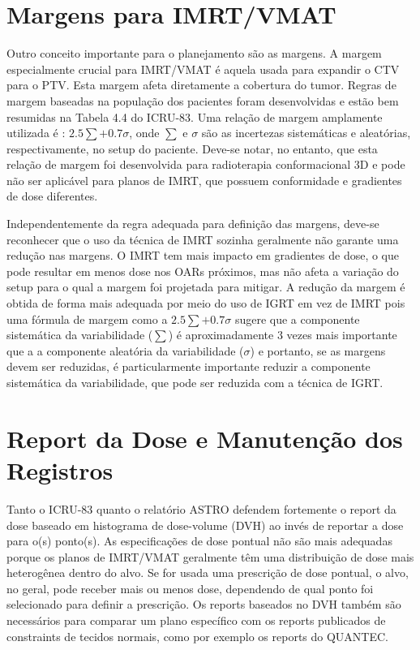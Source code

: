 \documentclass[11pt,a4paper]{article}
\newcounter{exemplo}
\begin{document}
\section{Margens para IMRT/VMAT}

	Outro conceito importante para o planejamento são as margens. A margem especialmente crucial para IMRT/VMAT é aquela usada para expandir o CTV para o PTV. Esta margem afeta diretamente a cobertura do tumor. Regras de margem baseadas na população dos pacientes foram desenvolvidas e estão bem resumidas na Tabela 4.4 do ICRU-83. Uma relação de margem amplamente utilizada é : $2.5 \sum + 0.7 \sigma$, onde $\sum$ e $\sigma$ são as incertezas sistemáticas e aleatórias, respectivamente, no setup do paciente. Deve-se notar, no entanto, que esta relação de margem foi desenvolvida para radioterapia conformacional 3D e pode não ser aplicável para planos de IMRT, que possuem conformidade e gradientes de dose diferentes. 

	Independentemente da regra adequada para definição das margens, deve-se reconhecer que o uso da técnica de IMRT sozinha geralmente não garante uma redução nas margens. O IMRT tem mais impacto em gradientes de dose, o que pode resultar em menos dose nos OARs próximos, mas não afeta a variação do setup para o qual a margem foi projetada para mitigar. A redução da margem é obtida de forma mais adequada por meio do uso de IGRT em vez de IMRT pois uma fórmula de margem como a  $2.5 \sum + 0.7 \sigma$ sugere que a componente sistemática da variabilidade ($\sum$) é aproximadamente 3 vezes mais importante que a a componente aleatória da variabilidade ($\sigma$) e portanto, se as margens devem ser reduzidas, é particularmente importante reduzir a componente sistemática da variabilidade, que pode ser reduzida com a técnica de IGRT.

\section{Report da Dose e Manutenção dos Registros}

	Tanto o ICRU-83 quanto o relatório ASTRO defendem fortemente o report da dose baseado em histograma de dose-volume (DVH) ao invés de reportar a dose para o(s) ponto(s). As especificações de dose pontual não são mais adequadas porque os planos de IMRT/VMAT geralmente têm uma distribuição de dose mais heterogênea dentro do alvo. Se for usada uma prescrição de dose pontual, o alvo, no geral, pode receber mais ou menos dose, dependendo de qual ponto foi selecionado para definir a prescrição. Os reports baseados no DVH também são necessários para comparar um plano específico com os reports publicados de constraints de tecidos normais, como por exemplo os reports do QUANTEC.
\end{document}
